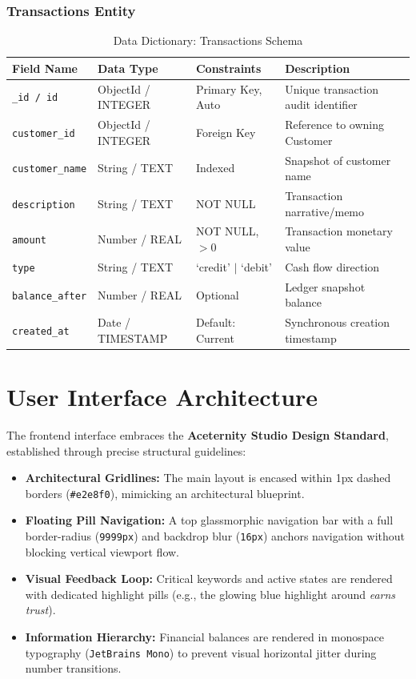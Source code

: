 \subsubsection{Transactions Entity}
\begin{table}[htbp]
\centering
\caption{Data Dictionary: Transactions Schema}
\label{tab:dict_tx}
\begin{tabular}{@{}llll@{}}
\toprule
\textbf{Field Name} & \textbf{Data Type} & \textbf{Constraints} & \textbf{Description} \\ \midrule
\texttt{\_id / id} & ObjectId / INTEGER & Primary Key, Auto & Unique transaction audit identifier \\
\texttt{customer\_id} & ObjectId / INTEGER & Foreign Key & Reference to owning Customer \\
\texttt{customer\_name}& String / TEXT & Indexed & Snapshot of customer name \\
\texttt{description} & String / TEXT & NOT NULL & Transaction narrative/memo \\
\texttt{amount} & Number / REAL & NOT NULL, $>0$ & Transaction monetary value \\
\texttt{type} & String / TEXT & `credit' $\mid$ `debit' & Cash flow direction \\
\texttt{balance\_after}& Number / REAL & Optional & Ledger snapshot balance \\
\texttt{created\_at} & Date / TIMESTAMP & Default: Current & Synchronous creation timestamp \\ \bottomrule
\end{tabular}
\end{table}

\section{User Interface Architecture}
The frontend interface embraces the \textbf{Aceternity Studio Design Standard}, established through precise structural guidelines:
\begin{itemize}
    \item \textbf{Architectural Gridlines:} The main layout is encased within 1px dashed borders (\texttt{\#e2e8f0}), mimicking an architectural blueprint.
    \item \textbf{Floating Pill Navigation:} A top glassmorphic navigation bar with a full border-radius (\texttt{9999px}) and backdrop blur (\texttt{16px}) anchors navigation without blocking vertical viewport flow.
    \item \textbf{Visual Feedback Loop:} Critical keywords and active states are rendered with dedicated highlight pills (e.g., the glowing blue highlight around \textit{earns trust}).
    \item \textbf{Information Hierarchy:} Financial balances are rendered in monospace typography (\texttt{JetBrains Mono}) to prevent visual horizontal jitter during number transitions.
\end{itemize}
